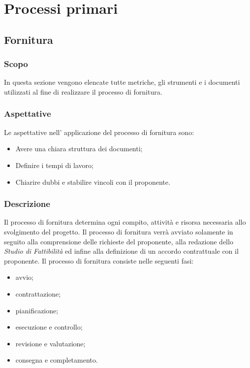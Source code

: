 
\section{Processi primari}\label{section:Processi_primari}
\subsection{Fornitura} \label{subsection:Fornitura}
\subsubsection{Scopo}\label{subsubsection: scopo_fornitura}
In questa sezione vengono elencate tutte metriche, gli strumenti e i documenti utilizzati al fine di realizzare il processo di fornitura.
\subsubsection{Aspettative}\label{subsubsection: aspettative_fornitura}
Le aspettative nell' applicazione del processo di fornitura sono:
\begin {itemize}
    \item Avere una chiara struttura dei documenti;
    \item Definire i tempi di lavoro;
    \item Chiarire dubbi e stabilire vincoli con il proponente.
\end {itemize}
\subsubsection{Descrizione}\label{subsubsection: descrizione_fornitura}
Il processo di fornitura determina ogni compito, attività e risorsa necessaria allo svolgimento del progetto.
Il processo di fornitura verrà avviato solamente in seguito alla comprensione delle richieste del proponente, alla redazione dello \textit{Studio di Fattibilità} ed infine alla definizione di un accordo contrattuale con il proponente.
Il processo di fornitura consiste nelle seguenti fasi:
\begin {itemize}
    \item avvio;
    \item contrattazione;
    \item pianificazione;
    \item esecuzione e controllo;
    \item revisione e valutazione;
    \item consegna e completamento.
\end {itemize}
